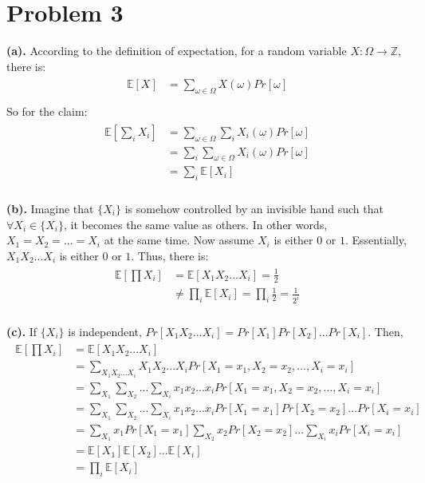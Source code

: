 \documentclass[titlepage, paper=a4, fontsize=11pt]{scrartcl} %
\numberwithin{equation}{section} %
\numberwithin{figure}{section} %
\numberwithin{table}{section} %
\begin{document}

\section*{Problem 3}
\textbf{(a).}
According to the definition of expectation, for a random variable $X: \Omega \to \mathbb{Z}$, there is:
\begin{align*} 
\begin{split}
\mathbb{E}[X] &= \sum_{\omega \in \Omega} X(\omega)Pr[\omega] \\
\end{split}					
\end{align*}
So for the claim:
\begin{align*} 
\begin{split}
\mathbb{E}[\sum_{i} X_i] &= \sum_{\omega \in \Omega} \sum_{i} X_i(\omega)Pr[\omega] \\
&= \sum_{i} \sum_{\omega \in \Omega} X_i(\omega)Pr[\omega] \\
&= \sum_{i} \mathbb{E}[X_i]
\end{split}					
\end{align*}
\\

\textbf{(b).}
Imagine that $\{X_i\}$ is somehow controlled by an invisible hand such that
$\forall X_i \in \{X_i\}$, it becomes the same value as others.
In other words, $X_1=X_2= ... =X_i$ at the same time.
Now assume $X_i$ is either $0$ or $1$. Essentially, $X_1X_2...X_i$ is either $0$ or $1$.
Thus, there is:
\begin{align*} 
\begin{split}
\mathbb{E}[\prod X_i] &= \mathbb{E}[X_1X_2...X_i] = \frac{1}{2} \\
&\neq \prod_i \mathbb{E}[X_i] = \prod_i \frac{1}{2} = \frac{1}{2^i}
\end{split}					
\end{align*}
\\

\textbf{(c).}
If $\{X_i\}$ is independent, $Pr[X_1X_2...X_i]=Pr[X_1]Pr[X_2]...Pr[X_i]$.
Then,
\begin{align*} 
\begin{split}
\mathbb{E}[\prod X_i] &= \mathbb{E}[X_1X_2...X_i] \\
&= \sum_{X_1X_2...X_i} X_1X_2...X_iPr[X_1=x_1,X_2=x_2, ... ,X_i=x_i] \\
&= \sum_{X_1}\sum_{X_2}...\sum_{X_i} x_1x_2...x_iPr[X_1=x_1,X_2=x_2, ... ,X_i=x_i] \\
&= \sum_{X_1}\sum_{X_2}...\sum_{X_i} x_1x_2...x_iPr[X_1=x_1]Pr[X_2=x_2]...Pr[X_i=x_i] \\
&= \sum_{X_1}x_1Pr[X_1=x_1]\sum_{X_2}x_2Pr[X_2=x_2]...\sum_{X_i}x_iPr[X_i=x_i] \\
&= \mathbb{E}[X_1]\mathbb{E}[X_2]...\mathbb{E}[X_i] \\
&= \prod_i \mathbb{E}[X_i]
\end{split}					
\end{align*}
\\
\end{document}
